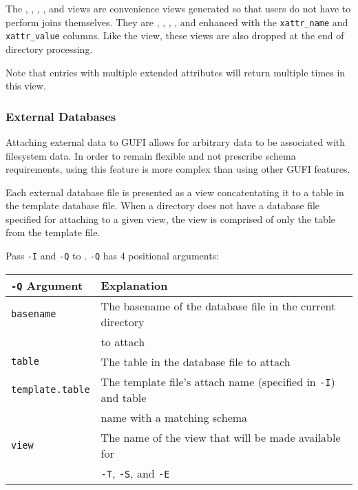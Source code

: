 The \xentries, \xpentries, \xsummary, \vrxpentries, and \vrxsummary
views are convenience views generated so that users do not have to
perform joins themselves. They are \entries, \pentries, \summary,
\vrpentries, and \vrsummary enhanced with the \texttt{xattr\_name} and
\texttt{xattr\_value} columns. Like the \xattrs view, these views are
also dropped at the end of directory processing.

Note that entries with multiple extended attributes will return
multiple times in this view.

\subsubsection{External Databases}
Attaching external data to GUFI allows for arbitrary data to be
associated with filesystem data. In order to remain flexible and not
prescribe schema requirements, using this feature is more complex than
using other GUFI features.

Each external database file is presented as a view concatentating it
to a table in the template database file. When a directory does not
have a database file specified for attaching to a given view, the view
is comprised of only the table from the template file.

Pass \texttt{-I} and \texttt{-Q} to \gufiquery. \texttt{-Q} has 4
positional arguments:

\begin{table}[h!]
  \centering
  \begin{tabular}{|l|l|}
    \hline
    \texttt{-Q} Argument & Explanation \\
    \hline
    \texttt{basename} & The basename of the database file in the current directory \\
                      & to attach \\
    \hline
    \texttt{table} & The table in the database file to attach \\
    \hline
    \texttt{template.table} & The template file's attach name (specified in \texttt{-I}) and table \\
                            & name with a matching schema \\
    \hline
    \texttt{view} & The name of the view that will be made available for \\
                  & \texttt{-T}, \texttt{-S}, and \texttt{-E} \\
    \hline
  \end{tabular}
\end{table}

